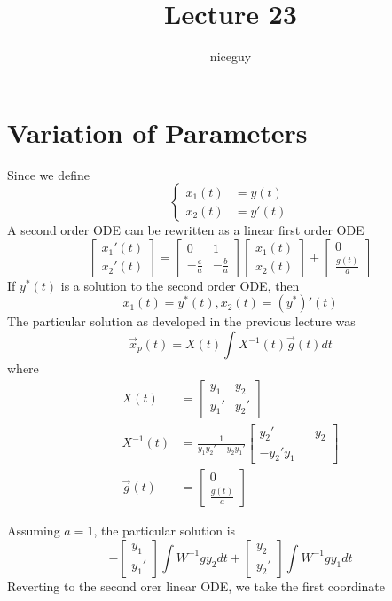 \documentclass[12pt]{article}
\author{niceguy}
\title{Lecture 23}
\begin{document}
\maketitle

\section{Variation of Parameters}
Since we define
$$\begin{cases}
	x_1(t) &= y(t) \\
	x_2(t) &= y'(t)
\end{cases}$$
A second order ODE can be rewritten as a linear first order ODE
$$\begin{bmatrix} x_1'(t) \\ x_2'(t)\end{bmatrix} = \begin{bmatrix} 0 & 1 \\ -\frac{c}{a} & -\frac{b}{a}\end{bmatrix} \begin{bmatrix} x_1(t) \\ x_2(t)\end{bmatrix} + \begin{bmatrix} 0 \\ \frac{g(t)}{a}\end{bmatrix}$$
If $y^*(t)$ is a solution to the second order ODE, then
$$x_1(t) = y^*(t), x_2(t) = (y^*)'(t)$$
The particular solution as developed in the previous lecture was
$$\vec{x}_p(t) = X(t)\int X^{-1}(t)\vec{g}(t)dt$$
where
\begin{align*}
	X(t) &= \begin{bmatrix} y_1 & y_2 \\ y_1' & y_2'\end{bmatrix} \\
	X^{-1}(t) &= \frac{1}{y_1y_2'-y_2y_1'} \begin{bmatrix} y_2' & -y_2 \\ -y_2' y_1\end{bmatrix} \\
	\vec{g}(t) &= \begin{bmatrix} 0 \\ \frac{g(t)}{a}\end{bmatrix}
\end{align*}

Assuming $a=1$, the particular solution is
$$-\begin{bmatrix}y_1 \\ y_1'\end{bmatrix}\int W^{-1}gy_2dt + \begin{bmatrix} y_2 \\ y_2'\end{bmatrix} \int W^{-1}gy_1dt$$
Reverting to the second orer linear ODE, we take the first coordinate
\end{document}
